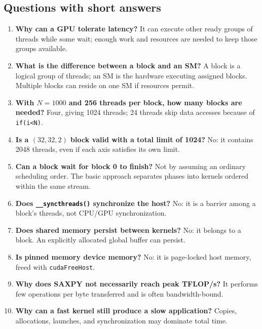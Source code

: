 \documentclass[11pt,a4paper]{article}
\let\originalsubsection\subsection
\renewcommand{\subsection}{\Needspace{5\baselineskip}\originalsubsection}
\begin{document}
\subsection{Questions with short answers}
\begin{enumerate}
\item \textbf{Why can a GPU tolerate latency?}
It can execute other ready groups of threads while some wait; enough work
and resources are needed to keep those groups available.
\item \textbf{What is the difference between a block and an SM?}
A block is a logical group of threads; an SM is the hardware executing
assigned blocks. Multiple blocks can reside on one SM if resources permit.
\item \textbf{With $N=1000$ and 256 threads per block, how many blocks are needed?}
Four, giving 1024 threads; 24 threads skip data accesses because of \texttt{if(i<N)}.
\item \textbf{Is a $(32,32,2)$ block valid with a total limit of 1024?}
No: it contains 2048 threads, even if each axis satisfies its own limit.
\item \textbf{Can a block wait for block 0 to finish?}
Not by assuming an ordinary scheduling order. The basic approach separates
phases into kernels ordered within the same stream.
\item \textbf{Does \texttt{\_\_syncthreads()} synchronize the host?}
No: it is a barrier among a block's threads, not CPU/GPU synchronization.
\item \textbf{Does shared memory persist between kernels?}
No: it belongs to a block. An explicitly allocated global buffer can persist.
\item \textbf{Is pinned memory device memory?}
No: it is page-locked host memory, freed with \texttt{cudaFreeHost}.
\item \textbf{Why does SAXPY not necessarily reach peak TFLOP/s?}
It performs few operations per byte transferred and is often bandwidth-bound.
\item \textbf{Why can a fast kernel still produce a slow application?}
Copies, allocations, launches, and synchronization may dominate total time.
\end{enumerate}
\end{document}
